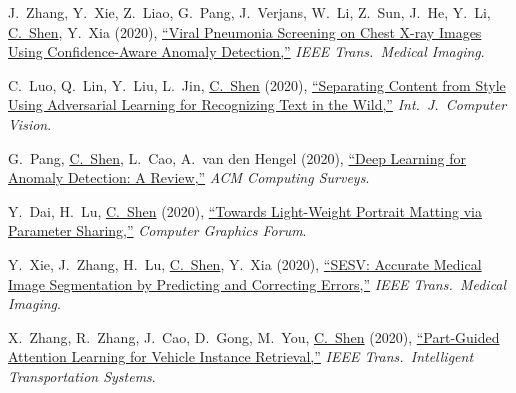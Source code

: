 \documentclass[9pt, a4paper]{article}
\newcommand{\years}[1]{\marginnote{\scriptsize #1}}
\def\highlight{\uline}
\begin{document}
\medskip

\years{2020} J.~Zhang, Y.~Xie, Z.~Liao, G.~Pang, J.~Verjans, W.~Li, Z.~Sun, J.~He, Y.~Li, \highlight{C.~Shen}, Y.~Xia (2020),
\href{http://www.google.com/search?lr=&ie=UTF-8&oe=UTF-8&q=Viral+Pneumonia+Screening+on+Chest+X-ray+Images+Using+Confidence-Aware+Anomaly+Detection+Jianpeng+Zhang%2C+Yutong+Xie%2C+Zhibin+Liao%2C+Guansong+Pang%2C+Johan+Verjans%2C+Wenxin+Li%2C+Zongji+Sun%2C+Jian+He%2C+Yi+Li%2C+Chunhua+Shen%2C+Yong+Xia}{``Viral Pneumonia Screening on Chest X-ray Images Using Confidence-Aware Anomaly Detection,{}''}
\emph{IEEE Trans.\  Medical Imaging}.

\medskip

\years{2020} C.~Luo, Q.~Lin, Y.~Liu, L.~Jin, \highlight{C.~Shen} (2020),
\href{http://www.google.com/search?lr=&ie=UTF-8&oe=UTF-8&q=Separating+Content+from+Style+Using+Adversarial+Learning+for+Recognizing+Text+in+the+Wild+Canjie+Luo%2C+Qingxiang+Lin%2C+Yuliang+Liu%2C+Lianwen+Jin%2C+Chunhua+Shen}{``Separating Content from Style Using Adversarial Learning for Recognizing Text in the Wild,{}''}
\emph{Int.\ J.\  Computer Vision}.

\medskip

\years{2020} G.~Pang, \highlight{C.~Shen}, L.~Cao, A.~van den Hengel (2020),
\href{http://www.google.com/search?lr=&ie=UTF-8&oe=UTF-8&q=Deep+Learning+for+Anomaly+Detection%3A+A+Review+Guansong+Pang%2C+Chunhua+Shen%2C+Longbing+Cao%2C+Anton+van+den+Hengel}{``Deep Learning for Anomaly Detection: A Review,{}''}
\emph{ACM Computing Surveys}.

\medskip

\years{2020} Y.~Dai, H.~Lu, \highlight{C.~Shen} (2020),
\href{http://www.google.com/search?lr=&ie=UTF-8&oe=UTF-8&q=Towards+Light-Weight+Portrait+Matting+via+Parameter+Sharing+Yutong+Dai%2C+Hao+Lu%2C+Chunhua+Shen}{``Towards Light-Weight Portrait Matting via Parameter Sharing,{}''}
\emph{Computer Graphics Forum}.

\medskip

\years{2020} Y.~Xie, J.~Zhang, H.~Lu, \highlight{C.~Shen}, Y.~Xia (2020),
\href{http://www.google.com/search?lr=&ie=UTF-8&oe=UTF-8&q=SESV%3A+Accurate+Medical+Image+Segmentation+by+Predicting+and+Correcting+Errors+Yutong+Xie%2C+Jianpeng+Zhang%2C+Hao+Lu%2C+Chunhua+Shen%2C+Yong+Xia}{``{SESV}: Accurate Medical Image Segmentation by Predicting and Correcting Errors,{}''}
\emph{IEEE Trans.\  Medical Imaging}.

\medskip

\years{2020} X.~Zhang, R.~Zhang, J.~Cao, D.~Gong, M.~You, \highlight{C.~Shen} (2020),
\href{http://www.google.com/search?lr=&ie=UTF-8&oe=UTF-8&q=Part-Guided+Attention+Learning+for+Vehicle+Instance+Retrieval+Xinyu+Zhang%2C+Rufeng+Zhang%2C+Jiewei+Cao%2C+Dong+Gong%2C+Mingyu+You%2C+Chunhua+Shen}{``Part-Guided Attention Learning for Vehicle Instance Retrieval,{}''}
\emph{IEEE Trans.\  Intelligent Transportation Systems}.
\end{document}
